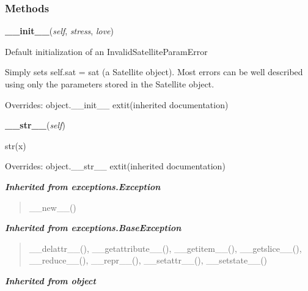   \subsubsection{Methods}

    \vspace{0.5ex}

\hspace{.8\funcindent}\begin{boxedminipage}{\funcwidth}

    \raggedright \textbf{\_\_init\_\_}(\textit{self}, \textit{stress}, \textit{love})

\setlength{\parskip}{2ex}
    Default initialization of an InvalidSatelliteParamError

    Simply sets self.sat = sat (a Satellite object).  Most errors can be 
    well described using only the parameters stored in the Satellite 
    object.

\setlength{\parskip}{1ex}
      Overrides: object.\_\_init\_\_ 	extit{(inherited documentation)}

    \end{boxedminipage}

    \vspace{0.5ex}

\hspace{.8\funcindent}\begin{boxedminipage}{\funcwidth}

    \raggedright \textbf{\_\_str\_\_}(\textit{self})

\setlength{\parskip}{2ex}
    str(x)

\setlength{\parskip}{1ex}
      Overrides: object.\_\_str\_\_ 	extit{(inherited documentation)}

    \end{boxedminipage}


\large{\textbf{\textit{Inherited from exceptions.Exception}}}

\begin{quote}
\_\_new\_\_()
\end{quote}

\large{\textbf{\textit{Inherited from exceptions.BaseException}}}

\begin{quote}
\_\_delattr\_\_(), \_\_getattribute\_\_(), \_\_getitem\_\_(), \_\_getslice\_\_(), \_\_reduce\_\_(), \_\_repr\_\_(), \_\_setattr\_\_(), \_\_setstate\_\_()
\end{quote}

\large{\textbf{\textit{Inherited from object}}}

